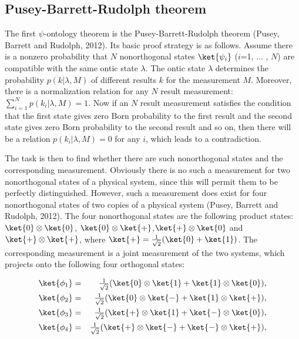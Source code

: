 \subsection{Pusey-Barrett-Rudolph theorem}

The first $\psi$-ontology theorem is the Pusey-Barrett-Rudolph theorem (Pusey, Barrett and Rudolph, 2012). Its basic proof strategy is as follows. %
Assume there is a nonzero probability that $N$ nonorthogonal states $\ket{\psi_i}$ ($i$=1, ... , $N$) are compatible with the same ontic state $\lambda$. The ontic state $\lambda$ determines the probability $p(k|\lambda,M)$ of different results $k$ for the measurement $M$. Moreover, there is a normalization relation for any $N$ result measurement: $\sum_{i=1}^{N}p(k_i|\lambda,M)=1$. Now if an $N$ result measurement satisfies the condition that the first state gives zero Born probability to the first result and the second state gives zero Born probability to the second result and so on, then there will be a relation $p(k_i|\lambda,M)=0$ for any $i$, which leads to a contradiction.

The task is then to find whether there are such nonorthogonal states and the corresponding measurement. Obviously there is no such a measurement for two nonorthogonal states of a physical system, since this will permit them to be perfectly distinguished. However, such a measurement does exist for four nonorthogonal states of two copies of a physical system (Pusey, Barrett and Rudolph, 2012). The four nonorthogonal states are the following product states: $\ket{0} \otimes \ket{0}$, $\ket{0} \otimes \ket{+}$,$\ket{+} \otimes \ket{0}$ and $\ket{+} \otimes \ket{+}$, where $\ket{+}= {1 \over \sqrt{2}}(\ket{0} + \ket{1})$. The corresponding measurement is a joint measurement of the two systems, which projects onto the following four orthogonal states:

\begin{eqnarray}\label{}
\ket{\phi_1}&=&\tfrac{1}{\sqrt{2}}(\ket{0}\otimes\ket{1}+\ket{1}\otimes\ket{0}), \nonumber\\
\ket{\phi_2}&=&\tfrac{1}{\sqrt{2}}(\ket{0}\otimes\ket{-}+\ket{1}\otimes\ket{+}), \nonumber\\
\ket{\phi_3}&=&\tfrac{1}{\sqrt{2}}(\ket{+}\otimes\ket{1}+\ket{-}\otimes\ket{0}), \nonumber\\
\ket{\phi_4}&=&\tfrac{1}{\sqrt{2}}(\ket{+}\otimes\ket{-}+\ket{-}\otimes\ket{+}),
\end{eqnarray}

